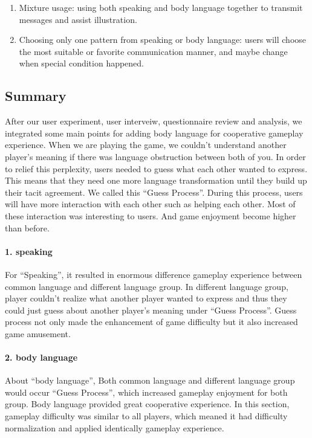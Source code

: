 \begin{enumerate}
  \item Mixture usage: using both speaking and body language together to transmit messages and assist illustration.

  \item Choosing only one pattern from speaking or body language: users will choose the most suitable or favorite communication manner, and maybe change when special condition happened.
\end{enumerate}


\subsection{Summary}
After our user experiment, user interveiw, questionnaire review and analysis, we integrated some main points for adding body language for cooperative gameplay experience. When we are playing the game, we couldn't understand another player's meaning if there was language obstruction between both of you. In order to relief this perplexity, users needed to guess what each other wanted to express. This means that they need one more language transformation until they build up their tacit agreement. We called this ``Guess Process''. During this process, users will have more interaction with each other such as helping each other. Most of these interaction was interesting to users. And 
game enjoyment become higher than before.

\paragraph{1. speaking}
For ``Speaking'', it resulted in enormous difference gameplay experience between common language and different language group. In different language group, player couldn't realize what another player wanted to express and thus they could just guess about another player's meaning under ``Guess Process''. Guess process not only made the enhancement of game difficulty but it also increased game amusement. 

\paragraph{2. body language}
About ``body language'', Both common language and different language group would occur ``Guess Process'', which increased gameplay enjoyment for both group. Body language provided great cooperative experience.
In this section, gameplay difficulty was similar to all players, which meaned it had difficulty normalization and applied identically gameplay experience.

